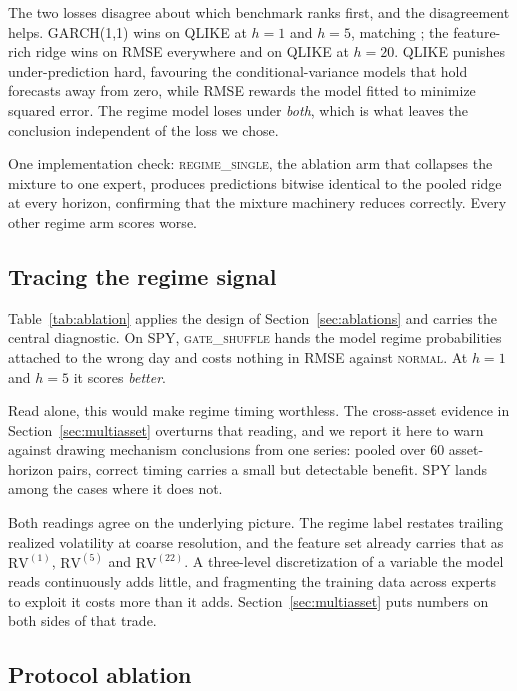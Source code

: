 \documentclass[sigconf,nonacm]{acmart}
\begin{document}
The two losses disagree about which benchmark ranks first, and the disagreement
helps. GARCH(1,1) wins on QLIKE at $h=1$ and $h=5$, matching
\cite{hansen2005forecast}; the feature-rich ridge wins on RMSE everywhere and on
QLIKE at $h=20$. QLIKE punishes under-prediction hard, favouring the
conditional-variance models that hold forecasts away from zero, while RMSE
rewards the model fitted to minimize squared error. The regime model loses under
\emph{both}, which is what leaves the conclusion independent of the loss we chose.

One implementation check: \textsc{regime\_single}, the ablation arm that
collapses the mixture to one expert, produces predictions bitwise identical to
the pooled ridge at every horizon, confirming that the mixture machinery reduces
correctly. Every other regime arm scores worse.

\subsection{Tracing the regime signal}



Table~\ref{tab:ablation} applies the design of Section~\ref{sec:ablations} and
carries the central diagnostic. On SPY, \textsc{gate\_shuffle} hands the model
regime probabilities attached to the wrong day and costs nothing in RMSE against
\textsc{normal}. At $h=1$ and $h=5$ it scores \emph{better}.

Read alone, this would make regime timing worthless. The cross-asset evidence in
Section~\ref{sec:multiasset} overturns that reading, and we report it here to
warn against drawing mechanism conclusions from one series: pooled over 60
asset-horizon pairs, correct timing carries a small but detectable benefit. SPY
lands among the cases where it does not.

Both readings agree on the underlying picture. The regime label restates trailing
realized volatility at coarse resolution, and the feature set already carries that
as $\mathrm{RV}^{(1)}$, $\mathrm{RV}^{(5)}$ and $\mathrm{RV}^{(22)}$. A
three-level discretization of a variable the model reads continuously adds
little, and fragmenting the training data across experts to exploit it costs more
than it adds. Section~\ref{sec:multiasset} puts numbers on both sides of that
trade.

\subsection{Protocol ablation}
\label{sec:protocol}
\end{document}
